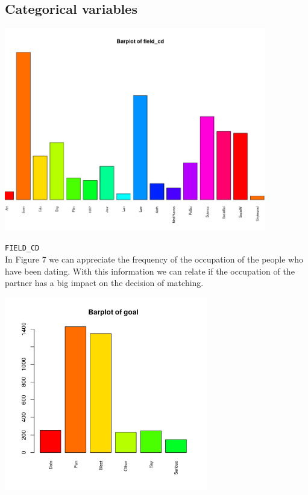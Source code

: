 \subsection{Categorical variables}

\begin{center}
\includegraphics[width=4.5in]{images/Hist_Plots_Analysis/barplot_field_cd.png}
\label{fig:aLabelForReferencing}
\end{center}

\texttt{FIELD\_CD}\\
In Figure 7 we can appreciate the frequency of the occupation of the people who have been dating. With this information we can relate if the occupation of the partner has a big impact on the decision of matching.

\begin{center}
\includegraphics[width=3.5in]{images/Hist_Plots_Analysis/barplot_goal.png}
\label{fig:aLabelForReferencing}
\end{center}

